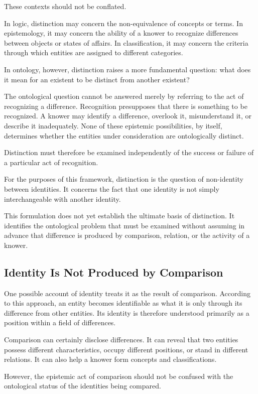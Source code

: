 These contexts should not be conflated.

In logic, distinction may concern the non-equivalence of concepts or
terms. In epistemology, it may concern the ability of a knower to
recognize differences between objects or states of affairs. In
classification, it may concern the criteria through which entities
are assigned to different categories.

In ontology, however, distinction raises a more fundamental question:
what does it mean for an existent to be distinct from another existent?

The ontological question cannot be answered merely by referring to
the act of recognizing a difference. Recognition presupposes that
there is something to be recognized. A knower may identify a
difference, overlook it, misunderstand it, or describe it inadequately.
None of these epistemic possibilities, by itself, determines whether
the entities under consideration are ontologically distinct.

Distinction must therefore be examined independently of the success
or failure of a particular act of recognition.

For the purposes of this framework, distinction is the question of
non-identity between identities. It concerns the fact that one identity
is not simply interchangeable with another identity.

This formulation does not yet establish the ultimate basis of
distinction. It identifies the ontological problem that must be
examined without assuming in advance that difference is produced
by comparison, relation, or the activity of a knower.

\subsection{Identity Is Not Produced by Comparison}

One possible account of identity treats it as the result of comparison.
According to this approach, an entity becomes identifiable as what
it is only through its difference from other entities. Its identity
is therefore understood primarily as a position within a field of
differences.

Comparison can certainly disclose differences. It can reveal that
two entities possess different characteristics, occupy different
positions, or stand in different relations. It can also help a knower
form concepts and classifications.

However, the epistemic act of comparison should not be confused
with the ontological status of the identities being compared.

